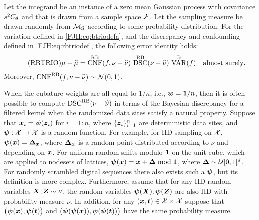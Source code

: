 \documentclass[graybox,footinfo]{svmult}
\DeclareMathOperator{\algn}{CNF}
\DeclareMathOperator{\disc}{DSC}
\DeclareMathOperator{\Var}{VAR}
\begin{document}
\begin{theorem}  \label{FJH:thm:rbtrio} Let 
the integrand be 
	an instance of a zero mean Gaussian process with covariance $s^2C_{{\boldsymbol{\theta}}}$ and 
	that is drawn from a sample space ${\mathcal{F}}$.  Let the sampling measure be drawn 
	randomly from ${\mathcal{M}}_{\textup{S}}$ according to some probability distribution.  For 
	the  
	variation defined in \eqref{FJH:eq:btriodefa}, and the discrepancy and 
	confounding defined in \eqref{FJH:eq:rbtriodef}, the following error identity holds: 
	\begin{equation} \tag{RBTRIO} \label{FJH:eq:rbtrio}
	\mu - \hmu  = \algn^{\Rn\Ba}(f,\nu - \hnu) \, \disc^{\Rn\Ba}(\nu - \hnu) \, \Var^{\Ba}(f) 
	\quad 
	\text{almost surely}.
	\end{equation}
	Moreover, $\algn^{\Rn\Ba}(f,\nu - \hnu) \sim \calN(0,1)$. 
\end{theorem}

\begin{FJHLesson}
	\FJHLessonSix
\end{FJHLesson}

When the cubature weights are all equal to $1/n$, i.e., ${\boldsymbol{w}} = {\boldsymbol{1}}/n$, then it is 
often possible to compute 
$\disc^{\Rn\Ba}(\nu - \hnu)$ in terms of the Bayesian discrepancy for a filtered kernel 
when the randomized data sites satisfy a natural 
property.  Suppose that ${\boldsymbol{x}}_i ={\boldsymbol{\psi}} ({\boldsymbol{z}}_i)$ for $i = 1 \!:\!n$, where 
$\{{\boldsymbol{z}}_i\}_{i=1}^n$ are deterministic data sites, and ${\boldsymbol{\psi}} :{\mathcal{X}} \to {\mathcal{X}}$ is a random 
function.  For example, for IID sampling on ${\mathcal{X}}$, ${\boldsymbol{\psi}}({\boldsymbol{x}}) = {\boldsymbol{\Delta}}_{\boldsymbol{x}}$, 
where 
${\boldsymbol{\Delta}}_{\boldsymbol{x}}$ is a random point distributed according to $\nu$ and depending on 
${\boldsymbol{x}}$.  For uniform random shifts modulo ${\boldsymbol{1}}$ on the unit cube, 
which are applied to nodesets of lattices, ${\boldsymbol{\psi}}({\boldsymbol{x}}) = {\boldsymbol{x}} + {\boldsymbol{\Delta}} \bmod {\boldsymbol{1}}$, 
where ${\boldsymbol{\Delta}} \sim {\mathcal{U}}[0,1]^d$.  For randomly scrambled digital sequences there 
also 
exists such a ${\boldsymbol{\psi}}$, but its definition is more complex.  Furthermore, assume that for 
any IID random variables ${\boldsymbol{X}}, {\boldsymbol{Z}} \sim \nu$,  the random variables ${\boldsymbol{\psi}}({\boldsymbol{X}}), 
{\boldsymbol{\psi}}({\boldsymbol{Z}})$ are also IID with probability measure $\nu$.  In addition, for any $({\boldsymbol{x}}, 
{\boldsymbol{t}}) \in {\mathcal{X}} \times {\mathcal{X}}$ suppose that  $\bigl({\boldsymbol{\psi}}({\boldsymbol{x}}), {\boldsymbol{\psi}}({\boldsymbol{t}}) \bigr)$ and 
$\bigl({\boldsymbol{\psi}}({\boldsymbol{\psi}}({\boldsymbol{x}})), {\boldsymbol{\psi}}({\boldsymbol{\psi}}({\boldsymbol{t}})) \bigr)$ have the same probability measure.
\end{document}
